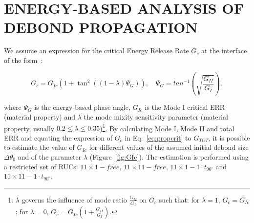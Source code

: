\documentclass[12pt,a4paper]{article}
\begin{document}
\section{ENERGY-BASED ANALYSIS OF DEBOND PROPAGATION}

We assume an expression for the critical Energy Release Rate $G_{c}$ at the interface of the form~\cite{Hutchinson1991,Mantic2009}:

\begin{equation}\label{eq:propcrit}
G_{c}=G_{Ic}\left(1+\tan^{2}\left(\left(1-\lambda\right)\Psi_{G}\right)\right),\quad\Psi_{G}=tan^{-1}\left(\sqrt{\frac{G_{II}}{G_{I}}}\right),
\end{equation}

where $\Psi_{G}$ is the energy-based phase angle, $G_{Ic}$ is the Mode I critical ERR (material property) and $\lambda$ the mode mixity sensitivity parameter (material property, usually $0.2\leq\lambda\leq0.35$)\footnote{$\lambda$ governs the influence of mode ratio $\frac{G_{II}}{G_{I}}$ on $G_{c}$ such that: for $\lambda=1$, $G_{c}=G_{Ic}$; for $\lambda=0$, $G_{c}=G_{Ic}\left(1+\frac{G_{II}}{G_{I}}\right)$.}. By calculating Mode I, Mode II and total ERR and equating the expression of $G_{c}$ in Eq.~\ref{eq:propcrit} to $G_{TOT}$, it is possible to estimate the value of $G_{Ic}$ for different values of the assumed initial debond size $\Delta\theta_{0}$ and of the parameter $\lambda$ (Figure~\ref{fig:GIc}). The estimation is performed using a restricted set of RUCs: $11\times 1-free$, $11\times 11-free$, $11\times 1-1\cdot t_{90^{\circ}}$ and $11\times 11-1\cdot t_{90^{\circ}}$.
\end{document}
